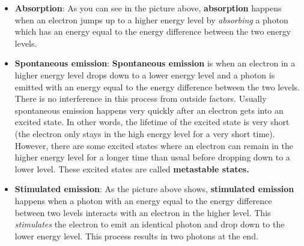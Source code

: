 \begin{itemize}
\item \textbf{Absorption}: As you can see in the picture above, \textbf{absorption} happens when an electron jumps up to a higher energy level by \textit{absorbing} a photon which has an energy equal to the energy difference between the two energy levels. 

\item \textbf{Spontaneous emission}: \textbf{Spontaneous emission} is when an electron in a higher energy level drops down to a lower energy level and a photon is emitted with an energy equal to the energy difference between the two levels. There is no interference in this process from outside factors. Usually spontaneous emission happens very quickly after an electron gets into an excited state. In other words, the lifetime of the excited state is very short (the electron only stays in the high energy level for a very short time). However, there are some excited states where an electron can remain in the higher energy level for a longer time than usual before dropping down to a lower level. These excited states are called \textbf{metastable states.}

\item \textbf{Stimulated emission}: As the picture above shows, \textbf{stimulated emission} happens when a photon with an energy equal to the energy difference between two levels interacts with an electron in the higher level. This \textit{stimulates} the electron to emit an identical photon and drop down to the lower energy level. This process results in two photons at the end.

\end{itemize}






